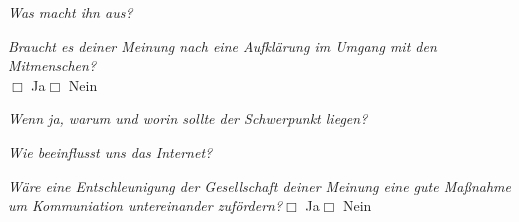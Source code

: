 \documentclass[a4paper,12pt]{scrartcl}
\newcommand{\checkbox}{\(\Box\)}
\newcommand{\frage}[1]{\textit{#1}}
\begin{document}
\frage{Was macht ihn aus?}
\vspace{2cm}

\newpage
\frage{Braucht es deiner Meinung nach eine Aufklärung im Umgang mit den Mitmenschen?}\\
\checkbox{} Ja\hspace{0.8cm}\checkbox{} Nein \par
\frage{Wenn ja, warum und worin sollte der Schwerpunkt liegen?}
\vspace{3cm}

\frage{Wie beeinflusst uns das Internet?}
\vspace{4cm}

\frage{Wäre eine Entschleunigung der Gesellschaft deiner Meinung eine gute Maßnahme um Kommuniation untereinander zufördern?}\hfill\checkbox{} Ja\hspace{0.8cm}\checkbox{} Nein
\end{document}
